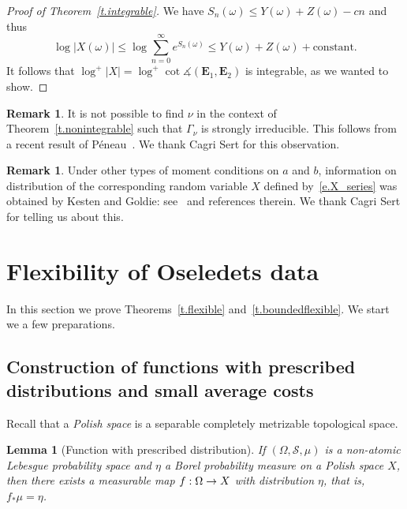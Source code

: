 \documentclass[10pt]{amsart}
\newtheorem{lemm}[theo]{Lemma}\newtheorem{prop}[theo]{Proposition}\newtheorem{coro}[theo]{Corollary}\newtheorem{conj}[theo]{Conjecture}
\theoremstyle{definition}\newtheorem{defi}[theo]{Definition}\newtheorem{rema}[theo]{Remark}\newtheorem{exam}[theo]{Example}\newtheorem{exem}[theo]{Example}\newtheorem{nota}[theo]{Notation}
\newcommand{\smallplus}{+}\newcommand{\smallminus}{-}\newcommand{\smalltimes}{\times}\newcommand{\smallpm}{\pm}\newcommand{\smallmp}{\mp}
\newcommand{\E}{\mathbf{E}}
\newcommand{\clS}{\mathcal{S}}
\renewcommand{\angle}{\measuredangle}
\renewcommand*{\to}{\mathchoice{\longrightarrow}{\rightarrow}{\rightarrow}{\rightarrow}}
\begin{document}
\begin{proof}[Proof of Theorem~\ref{t.integrable}]
We have $S_n(\omega) \le Y(\omega) + Z(\omega) -cn$ and thus
\begin{equation}
\log |X (\omega)| \le \log \sum_{n=0}^\infty e^{S_n(\omega)} \le Y(\omega) + Z(\omega) + \text{constant}.
\end{equation}
It follows that $\log^{\smallplus} |X| = \log^{\smallplus} \cot \angle(\E_1, \E_2)$ is integrable, as we wanted to show.
\end{proof}

\begin{rema}
It is not possible to find $\nu$ in the context of Theorem~\ref{t.nonintegrable} such that $\Gamma_\nu$ is strongly irreducible. This follows from a recent result of Péneau~\cite[Corollary~1.14]{Peneau}. We thank Cagri Sert for this observation.
\end{rema}

\begin{rema}
Under other types of moment conditions on $a$ and $b$, information on distribution of the corresponding random variable $X$ defined by~\eqref{e.X_series} was obtained by Kesten and Goldie: see~\cite{BDZ} and references therein. We thank Cagri Sert for telling us about this.
\end{rema}



\section{Flexibility of Oseledets data}\label{s.general}

In this section we prove Theorems~\ref{t.flexible} and~\ref{t.boundedflexible}. We start we a few preparations.

\subsection{Construction of functions with prescribed distributions and small average costs}

Recall that a \emph{Polish space} is a separable completely metrizable topological space.


\begin{lemm}[Function with prescribed distribution]\label{l.basic}
If $(\Omega,\clS,\mu)$ is a non-atomic Lebesgue probability space and $\eta$ a Borel probability measure on a Polish space $X$, then there exists a measurable map $f:\Omega \to X$ with distribution $\eta$, that is, $f_*\mu= \eta$.
\end{lemm}
\end{document}
